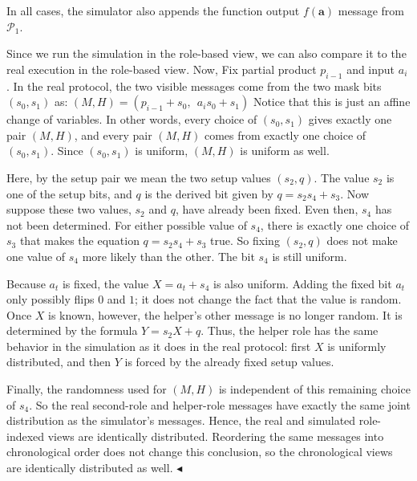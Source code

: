 \documentclass[10pt,a4paper]{article}
\begin{document}
In all cases, the simulator also appends the function output $f(\mathbf{a})$ message from $\mathcal{P}_{1}$.\par




Since we run the simulation in the role-based view, we can also compare it to the real execution in the role-based view. Now, Fix partial product $p_{i-1}$ and input $a_{i}$. In the real protocol, the two visible messages come from the two mask bits $(s_{0},s_{1})$ as:
$(M,H)=(p_{i-1}+s_{0},\ \ a_{i}s_{0}+s_{1})$
Notice that this is just an affine change of variables. In other words, every choice of $(s_{0},s_{1})$ gives exactly one pair $(M,H)$, and every pair $(M,H)$ comes from exactly one choice of $(s_{0},s_{1})$. Since $(s_{0},s_{1})$ is uniform, $(M,H)$ is uniform as well.\par




Here, by the setup pair we mean the two setup values $(s_{2},q)$. The value $s_{2}$ is one of the setup bits, and $q$ is the derived bit given by $q=s_{2}s_{4}+s_{3}$. Now suppose these two values, $s_{2}$ and $q$, have already been fixed. Even then, $s_{4}$ has not been determined. For either possible value of $s_{4}$, there is exactly one choice of $s_{3}$ that makes the equation $q=s_{2}s_{4}+s_{3}$ true. So fixing $(s_{2},q)$ does not make one value of $s_{4}$ more likely than the other. The bit $s_{4}$ is still uniform.\par




Because $a_{t}$ is fixed, the value $X=a_{t}+s_{4}$ is also uniform. Adding the fixed bit $a_{t}$ only possibly flips $0$ and $1$; it does not change the fact that the value is random. Once $X$ is known, however, the helper’s other message is no longer random. It is determined by the formula $Y=s_{2}X+q$. Thus, the helper role has the same behavior in the simulation as it does in the real protocol: first $X$ is uniformly distributed, and then $Y$ is forced by the already fixed setup values.\par




Finally, the randomness used for $(M,H)$ is independent of this remaining choice of $s_{4}$. So the real second-role and helper-role messages have exactly the same joint distribution as the simulator’s messages. Hence, the real and simulated role-indexed views are identically distributed. Reordering the same messages into chronological order does not change this conclusion, so the chronological views are identically distributed as well.
$\blacktriangleleft$\par
\end{document}
